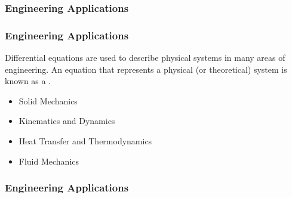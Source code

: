 \documentclass[fleqn]{beamer} %
\newcommand{\sectionIsubsectionIItitle}{Engineering Applications}
\begin{document}
			\begin{frame}
				\frametitle{\sectionIsubsectionIItitle}
				\bigskip

					\frametitle{Engineering Applications}

					Differential equations are used to describe physical systems in many areas of engineering. An equation that represents a physical (or theoretical) system is known as a \underline{\hspace{50mm}}\hspace{3mm}\underline{\hspace{50mm}}.\vspace{3mm}\\
					\begin{itemize}

						\item Solid Mechanics \vspace{3mm}\\
						\item Kinematics and Dynamics \vspace{3mm}\\
						\item Heat Transfer and Thermodynamics \vspace{3mm}\\
						\item Fluid Mechanics
								
					\end{itemize}
			
				\btVFill
			\end{frame}

			\begin{frame}
				\frametitle{\sectionIsubsectionIItitle}
				\bigskip
				

				  
		
				\btVFill
			\end{frame}

\end{document}
